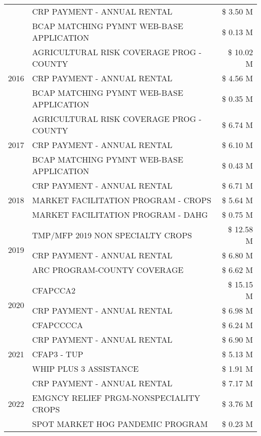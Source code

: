 \begin{tabular}{llr}
 & CRP PAYMENT - ANNUAL RENTAL & \$ 3.50 M \\
 & BCAP MATCHING PYMNT WEB-BASE APPLICATION & \$ 0.13 M \\
\cline{1-3}
\multirow[t]{3}{*}{2016} & AGRICULTURAL RISK COVERAGE PROG - COUNTY & \$ 10.02 M \\
 & CRP PAYMENT - ANNUAL RENTAL & \$ 4.56 M \\
 & BCAP MATCHING PYMNT WEB-BASE APPLICATION & \$ 0.35 M \\
\cline{1-3}
\multirow[t]{3}{*}{2017} & AGRICULTURAL RISK COVERAGE PROG - COUNTY & \$ 6.74 M \\
 & CRP PAYMENT - ANNUAL RENTAL & \$ 6.10 M \\
 & BCAP MATCHING PYMNT WEB-BASE APPLICATION & \$ 0.43 M \\
\cline{1-3}
\multirow[t]{3}{*}{2018} & CRP PAYMENT - ANNUAL RENTAL & \$ 6.71 M \\
 & MARKET FACILITATION PROGRAM - CROPS & \$ 5.64 M \\
 & MARKET FACILITATION PROGRAM - DAHG & \$ 0.75 M \\
\cline{1-3}
\multirow[t]{3}{*}{2019} & TMP/MFP 2019 NON SPECIALTY CROPS & \$ 12.58 M \\
 & CRP PAYMENT - ANNUAL RENTAL & \$ 6.80 M \\
 & ARC PROGRAM-COUNTY COVERAGE & \$ 6.62 M \\
\cline{1-3}
\multirow[t]{3}{*}{2020} & CFAPCCA2 & \$ 15.15 M \\
 & CRP PAYMENT - ANNUAL RENTAL & \$ 6.98 M \\
 & CFAPCCCCA & \$ 6.24 M \\
\cline{1-3}
\multirow[t]{3}{*}{2021} & CRP PAYMENT - ANNUAL RENTAL & \$ 6.90 M \\
 & CFAP3 - TUP & \$ 5.13 M \\
 & WHIP PLUS 3 ASSISTANCE & \$ 1.91 M \\
\cline{1-3}
\multirow[t]{3}{*}{2022} & CRP PAYMENT - ANNUAL RENTAL & \$ 7.17 M \\
 & EMGNCY RELIEF PRGM-NONSPECIALITY CROPS & \$ 3.76 M \\
 & SPOT MARKET HOG PANDEMIC PROGRAM & \$ 0.23 M \\
\cline{1-3}
\bottomrule
\end{tabular}
